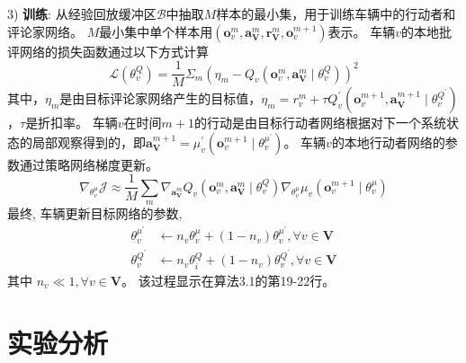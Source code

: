 3) \textbf{训练}: 从经验回放缓冲区$\mathcal{B}$中抽取$M$样本的最小集，用于训练车辆中的行动者和评论家网络。
$M$最小集中单个样本用$(\boldsymbol{o}_{v}^{m}, \boldsymbol{a}_{\mathbf{V}}^{m}, \boldsymbol{r}_{\mathbf{V}}^{m}, \boldsymbol{o}_{v}^{m+1})$表示。
车辆$v$的本地批评网络的损失函数通过以下方式计算
\begin{equation}
	\mathcal{L}\left(\theta_{v}^{Q}\right)=\frac{1}{M} \Sigma_{m}\left(\eta_{m}-Q_{v}\left(\boldsymbol{o}_{v}^{m}, \boldsymbol{a}_{\mathbf{V}}^{m} \mid \theta_{v}^{Q}\right)\right)^{2}
\end{equation}
\noindent 其中，$\eta_{m}$是由目标评论家网络产生的目标值，$\eta_{m}=r_{v}^{m}+\tau Q_{v}^{\prime}(\boldsymbol{o}_{v}^{m+1}, \boldsymbol{a}_{\mathbf{V}}^{m+1} \mid \theta_{v}^{Q^{\prime}})$，$\tau$是折扣率。
车辆$v$在时间$m+1$的行动是由目标行动者网络根据对下一个系统状态的局部观察得到的，即$\boldsymbol{a}_{\mathbf{V}}^{m+1}=\mu_{v}^{\prime}(\boldsymbol{o}_{v}^{m+1} \mid \theta_{v}^{\mu^{\prime}})$。
车辆$v$的本地行动者网络的参数通过策略网络梯度更新。
\begin{equation}
	\nabla_{\theta_{v}^{\mu}} \mathcal{J} \approx \frac{1}{M} \sum_{m} \nabla_{\boldsymbol{a}_{\mathbf{V}}^{m}} Q_{v}\left(\boldsymbol{o}_{v}^{m}, \boldsymbol{a}_{\mathbf{V}}^{m} \mid \theta_{v}^{Q}\right) \nabla_{\theta_{v}^{\mu}} \mu_{v}\left(\boldsymbol{o}_{v}^{m+1} \mid \theta_{v}^{\mu}\right)
\end{equation}
最终, 车辆更新目标网络的参数,
\begin{align}
	\theta_{v}^{\mu^{\prime}} &\leftarrow n_{v} \theta_{v}^{\mu}+(1-n_{v})  \theta_{v}^{\mu^{\prime}}, \forall v \in \mathbf{V}\\
	\theta_{v}^{Q^{\prime}} &\leftarrow n_{v} \theta_{i}^{Q}+(1-n_{v})  \theta_{v}^{Q^{\prime}}, \forall v \in \mathbf{V}
\end{align}
\noindent 其中 $n_{v} \ll 1, \forall v \in \mathbf{V} $。
该过程显示在算法3.1的第19-22行。

\section{实验分析}\label{section 3-5}

